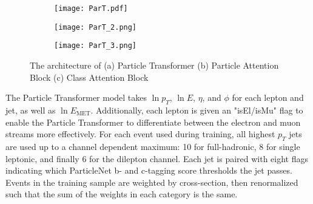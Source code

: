 \begin{figure}[H]
    \centering
    \begin{subfigure}{1.0\textwidth}
        \texttt{[image: ParT.pdf]}
        \caption{}
        \label{subfig:ParT_1}
    \end{subfigure}

    \vspace{0.1cm}
    
    \begin{subfigure}{0.63\textwidth}
    \centering
        \texttt{[image: ParT\_2.png]}
        \caption{}
        \label{subfig:ParT_2}        
    \end{subfigure} 
    \begin{subfigure}{0.33\textwidth}
    \centering
        \texttt{[image: ParT\_3.png]}
        \caption{}
        \label{subfig:ParT_3}        
    \end{subfigure} 
    \caption{The architecture of (a) Particle Transformer (b) Particle Attention Block (c) Class Attention Block \cite{ParticleTransformer}}
    \label{fig:ParT}
\end{figure}

The Particle Transformer model takes $\ln{p_T}$, $\ln{E}$, $\eta$, and $\phi$ for each lepton and jet, as well as $\ln{E_\text{MET}}$. Additionally, each lepton is given an "isEl/isMu" flag to enable the Particle Transformer to differentiate between the electron and muon streams more effectively. For each event used during training, all highest $p_T$ jets are used up to a channel dependent maximum: 10 for full-hadronic, 8 for single leptonic, and finally 6 for the dilepton channel. Each jet is paired with eight flags indicating which ParticleNet b- and c-tagging score thresholds the jet passes. Events in the training sample are weighted by cross-section, then renormalized such that the sum of the weights in each category is the same.

